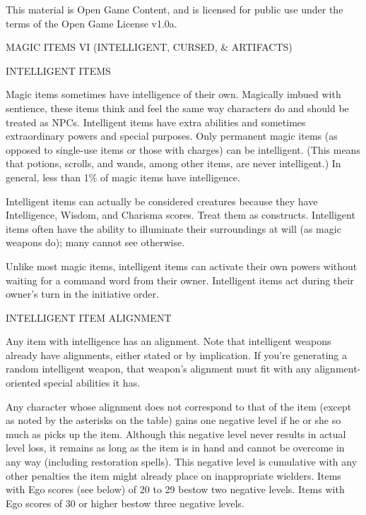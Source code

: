 This material is Open Game Content, and is licensed for public use under the terms of the Open Game License v1.0a.

MAGIC ITEMS VI (INTELLIGENT, CURSED, & ARTIFACTS)



INTELLIGENT ITEMS

Magic items sometimes have intelligence of their own. Magically imbued with sentience, these items think and feel the same way characters do and should be treated as NPCs. Intelligent items have extra abilities and sometimes extraordinary powers and special purposes. Only permanent magic items (as opposed to single-use items or those with charges) can be intelligent. (This means that potions, scrolls, and wands, among other items, are never intelligent.) In general, less than 1\% of magic items have intelligence.

Intelligent items can actually be considered creatures because they have Intelligence, Wisdom, and Charisma scores. Treat them as constructs. Intelligent items often have the ability to illuminate their surroundings at will (as magic weapons do); many cannot see otherwise.

Unlike most magic items, intelligent items can activate their own powers without waiting for a command word from their owner. Intelligent items act during their owner's turn in the initiative order.



INTELLIGENT ITEM ALIGNMENT

Any item with intelligence has an alignment. Note that intelligent weapons already have alignments, either stated or by implication.  If you're generating a random intelligent weapon, that weapon's alignment must fit with any alignment-oriented special abilities it has.

Any character whose alignment does not correspond to that of the item (except as noted by the asterisks on the table) gains one negative level if he or she so much as picks up the item. Although this negative level never results in actual level loss, it remains as long as the item is in hand and cannot be overcome in any way (including restoration spells). This negative level is cumulative with any other penalties the item might already place on inappropriate wielders. Items with Ego scores (see below) of 20 to 29 bestow two negative levels. Items with Ego scores of 30 or higher bestow three negative levels.

 

